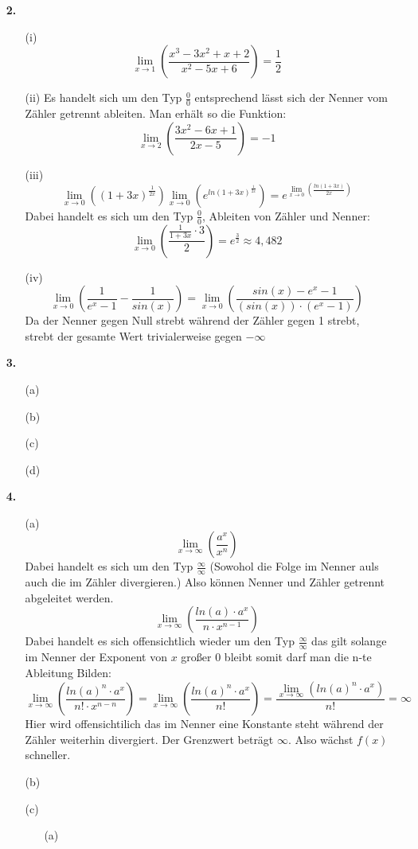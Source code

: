 \documentclass[a4paper,11pt,fleqn]{scrartcl}
\newcommand{\bra}[1]{\left(#1\right)}
\newcommand{\limx}[1]{\lim\limits_{x \rightarrow \infty}\bra{#1}}
\newcommand{\limxx}[2]{\lim\limits_{x \rightarrow #1}\bra{#2}}
\begin{document}
\begin{enumerate}
\begin{enumerate}
        \end{enumerate}
    \item[\textbf{2.}]
        \begin{enumerate}
            \item[(i)]
                \[ \limxx{1}{\frac{x^3 - 3x^2 + x + 2}{x^2 - 5x + 6}} = \frac{1}{2}\]
            \item[(ii)]
                Es handelt sich um den Typ $\frac{0}{0}$ entsprechend lässt sich der Nenner vom Zähler getrennt ableiten.
                Man erhält so die Funktion: \[ \limxx{2}{\frac{3x^2 - 6x + 1}{2x - 5}} = -1\]
            \item[(iii)]
                \[ \limxx{0}{(1+3x)^\frac{1}{2x}} \limxx{0}{e^{ln(1+3x)^\frac{1}{2x}}} = e^{\limxx{0}{\frac{ln(1+3x)}{2x}}} \]
                Dabei handelt es sich um den Typ $\frac{0}{0}$, Ableiten von Zähler und Nenner:
                \[ \limxx{0}{\frac{ \frac{1}{1+3x} \cdot 3 }{2}} = e^{\frac{3}{2}} \approx 4,482 \]
            \item[(iv)]
                \[ \limxx{0}{ \frac{1}{e^x - 1} - \frac{1}{sin(x)}} = \limxx{0}{\frac{sin(x) - e^x - 1}{(sin(x)) \cdot (e^x-1)}} \]
                Da der Nenner gegen Null strebt während der Zähler gegen 1 strebt, strebt der gesamte Wert trivialerweise gegen $- \infty$
        \end{enumerate}
    \item[\textbf{3.}]
        \begin{enumerate}
            \item[(a)]
            \item[(b)]
            \item[(c)]
            \item[(d)]
        \end{enumerate}
    \item[\textbf{4.}]
        \begin{enumerate}
            \item[(a)]
                \[ \limx{ \frac{a^x}{x^n} }\] Dabei handelt es sich um den Typ $\frac{\infty}{\infty}$ (Sowohol die Folge im Nenner auls auch die im Zähler divergieren.)
                Also können Nenner und Zähler getrennt abgeleitet werden. 
                \[\limx{\frac{ln(a) \cdot a^x}{n \cdot x^{n-1}}}\] Dabei handelt es sich offensichtlich wieder um den Typ $\frac{\infty}{\infty}$ das gilt solange im Nenner der Exponent von $x$ großer 0 bleibt somit darf man die n-te Ableitung Bilden:
                \[\limx{\frac{ln(a)^n \cdot a^x}{n! \cdot x^{n-n}}} = \limx{\frac{ln(a)^n \cdot a^x}{n!}} = \frac{\limx{ln(a)^n \cdot a^x}}{n!} = \infty\]
                Hier wird offensichtilich das im Nenner eine Konstante steht während der Zähler weiterhin divergiert. Der Grenzwert beträgt $\infty$. Also wächst $f(x)$ schneller.
            \item[(b)]
            \item[(c)]
                \begin{enumerate}
                \item[(a)]
                \end{enumerate}
        \end{enumerate}
\end{enumerate}
\end{document}
